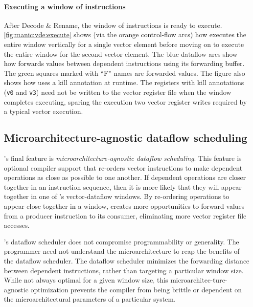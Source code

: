 \paragraph{Executing a window of instructions}
After Decode \& Rename, the window of instructions is ready to execute.
\autoref{fig:manic:vde:execute} shows (via the orange control-flow arcs) how \manic
executes the entire window vertically for a single vector element before moving
on to execute the entire window for the second vector element.
%
The blue dataflow arcs show how \manic forwards values between dependent
instructions using its forwarding buffer.  The green squares marked with ``F'' names
are forwarded values.
%
The figure also shows how \manic uses a kill annotation at runtime.
%
The registers with kill annotations ({\tt v0} and {\tt v3}) need not be written
to the vector register file when the window completes executing, sparing the
execution two vector register writes required by a typical vector execution. 

\subsection{Microarchitecture-agnostic dataflow scheduling}
\label{manic:design:schedule}
\manic's final feature is {\em microarchitecture-agnostic
dataflow scheduling}.
%
This feature is optional compiler support that
re-orders vector instructions to make dependent operations as close as possible to one another.  If dependent operations are closer together in an instruction
sequence, then it is more likely that they will appear together in one of
\manic's vector-dataflow windows.  By re-ordering operations to appear close
together in a window, \manic creates more opportunities to
forward values from a producer instruction to its consumer,
eliminating more vector register file accesses.

\manic's dataflow scheduler does not compromise programmability or generality.
The programmer need not understand the microarchitecture to reap the benefits
of the dataflow scheduler.  The dataflow scheduler minimizes the forwarding
distance between dependent instructions, rather than targeting a particular
window size.  While not always optimal for a given window size, this
microarchitec-ture-agnostic optimization prevents the compiler from being
brittle or dependent on the microarchitectural parameters of a
particular system. 

